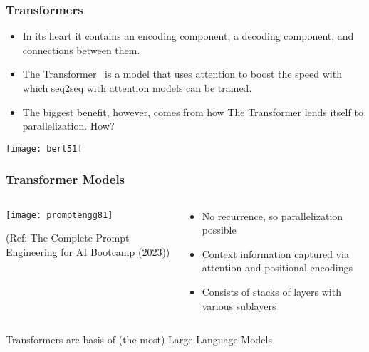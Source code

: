  


\begin{frame}[fragile]\frametitle{Transformers}


\begin{itemize}
\item In its heart it contains an encoding component, a decoding component, and connections between them.
\item The Transformer  is a model that uses attention to boost the speed with which seq2seq with attention models can be trained. 
\item The biggest benefit, however, comes from how The Transformer lends itself to parallelization. How?
\end{itemize}	 

\begin{center}
\texttt{[image: bert51]}
\end{center}	

\end{frame}

\begin{frame}[fragile]\frametitle{Transformer Models}

\begin{columns}
    \begin{column}[T]{0.7\linewidth}
		\begin{center}
		\texttt{[image: promptengg81]}

		{\tiny (Ref: The Complete Prompt Engineering for AI Bootcamp (2023))}
		\end{center}	
    \end{column}
    \begin{column}[T]{0.3\linewidth}
		\begin{itemize}
		\item  No recurrence, so parallelization possible
		\item  Context information captured via attention and positional encodings
		\item Consists of stacks of layers with various sublayers
		\end{itemize}
    \end{column}
  \end{columns}
  
Transformers are basis of (the most) Large Language Models


\end{frame}


